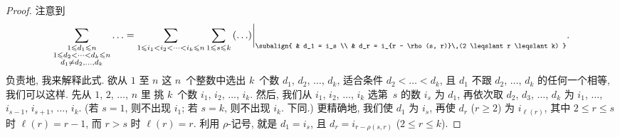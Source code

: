 \documentclass[%
    UTF8,%
    fontset=none,%
    punct=kaiming,%
    zihao=-4,%
    a4paper,%
    oneside,%
]{ctexbook}
\let\emph\relax
\renewcommand*{\leq}{\leqslant}
\renewcommand*{\geq}{\geqslant}
\begin{document}
\begin{proof}
    注意到
    \begin{align*}
        \sum_{\substack{
        1 \leq d_1 \leq n                              \\
        1 \leq d_2 < \dots < d_k \leq n                \\
                d_1 \neq d_2,\dots,d_k
            }} {\dots}
        =
        \sum_{1 \leq i_1 < i_2 < \dots < i_k \leq n}
        { \sum_{1 \leq s \leq k}
        { {({\dots})}\bigg|_{
        \subalign{
         & d_1 = i_s                                   \\
         & d_r = i_{r - \rho(s, r)}\,(2 \leq r \leq k)
        }
        }}}.
    \end{align*}
    负责地, 我来解释此式.
    欲从 \(1\) 至 \(n\) 这 \(n\)~个整数中选出 \(k\)~个数
    \(d_1\), \(d_2\), \(\dots\), \(d_k\),
    适合条件 \(d_2 < \dots < d_k\),
    且 \(d_1\) 不跟 \(d_2\), \(\dots\), \(d_k\) 的任何一个相等,
    我们可以这样.
    先从 \(1\), \(2\), \(\dots\), \(n\) 里\emph{从小到大地}%
    挑 \(k\)~个数 \(i_1\), \(i_2\), \(\dots\), \(i_k\).
    然后, 我们从 \(i_1\), \(i_2\), \(\dots\), \(i_k\)
    选第~\(s\) \emph{小}的数 \(i_s\) 为 \(d_1\),
    再依次取 \(d_2\), \(d_3\), \(\dots\), \(d_k\)
    为
    \(i_1\), \(\dots\), \(i_{s-1}\),
    \(i_{s+1}\), \(\dots\), \(i_{k}\).
    (若 \(s = 1\), 则不出现 \(i_1\);
    若 \(s = k\), 则不出现 \(i_k\).
    下同.)
    更精确地, 我们使 \(d_1\) 为 \(i_s\),
    再使 \(d_r\) (\(r \geq 2\)) 为 \(i_{\ell (r)}\),
    其中 \(2 \leq r \leq s\) 时 \(\ell (r) = r-1\),
    而 \(r > s\) 时 \(\ell (r) = r\).
    利用 \(\rho\)-记号, 就是 \(d_1 = i_s\),
    且 \(d_r = i_{r - \rho(s, r)}\) (\(2 \leq r \leq k\)).

    \endgroup


\end{proof}
\end{document}

